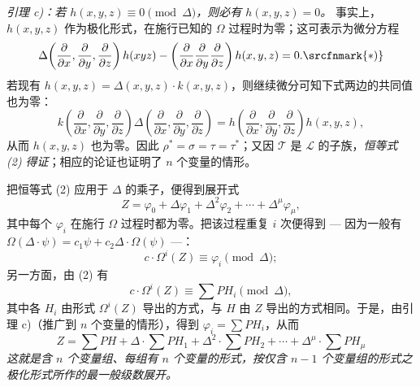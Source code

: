 \emph{引理 c)：若 $h(x,y,z)\equiv0\pmod{\Delta}$，则必有 $h(x,y,z)=0$。}
事实上，$h(x,y,z)$ 作为极化形式，在施行已知的 $\Omega$ 过程时为零；这可表示为微分方程
\[
  \Delta\!\left(\frac{\partial}{\partial x},\frac{\partial}{\partial y},\frac{\partial}{\partial z}\right)h(xyz)
  -\left(\frac{\partial}{\partial x}\frac{\partial}{\partial y}\frac{\partial}{\partial z}\right)h(x,y,z)=0.\srcfnmark{*)}
\]
若现有 $h(x,y,z)=\Delta(x,y,z)\cdot k(x,y,z)$，则继续微分可知下式两边的共同值也为零：
\[
  k\!\left(\frac{\partial}{\partial x},\frac{\partial}{\partial y},\frac{\partial}{\partial z}\right)
  \Delta\!\left(\frac{\partial}{\partial x},\frac{\partial}{\partial y},\frac{\partial}{\partial z}\right)
  =
  h\!\left(\frac{\partial}{\partial x},\frac{\partial}{\partial y},\frac{\partial}{\partial z}\right)h(x,y,z),
\]
从而 $h(x,y,z)$ 也为零。因此 $\rho^*=\sigma=\tau=\tau^*$；又因 $\mathcal T$ 是 $\mathcal L$ 的子族，\emph{恒等式 (2) 得证}；相应的论证也证明了 $n$ 个变量的情形。

把恒等式 (2) 应用于 $\Delta$ 的乘子，便得到展开式
\[
  Z=\varphi_0+\Delta\varphi_1+\Delta^2\varphi_2+\cdots+\Delta^\mu\varphi_\mu,
\]
其中每个 $\varphi_i$ 在施行 $\Omega$ 过程时都为零。把该过程重复 $i$ 次便得到 --- 因为一般有 $\Omega(\Delta\cdot\psi)=c_1\psi+c_2\Delta\cdot\Omega(\psi)$ ---：
\[
  c\cdot \Omega^i(Z)\equiv\varphi_i\pmod{\Delta};
\]
另一方面，由 (2) 有
\[
  c\cdot\Omega^i(Z)\equiv\sum PH_i\pmod{\Delta},
\]
其中各 $H_i$ 由形式 $\Omega^i(Z)$ 导出的方式，与 $H$ 由 $Z$ 导出的方式相同。于是，由引理 c)（推广到 $n$ 个变量的情形），得到 $\varphi_i=\sum PH_i$，从而
\begin{equation}
  Z=\sum PH+\Delta\cdot\sum PH_1+\Delta^2\cdot\sum PH_2+
  \cdots+\Delta^\mu\cdot\sum PH_\mu
\tag{3}
\end{equation}
\emph{这就是含 $n$ 个变量组、每组有 $n$ 个变量的形式，按仅含 $n-1$ 个变量组的形式之极化形式所作的最一般级数展开。}

